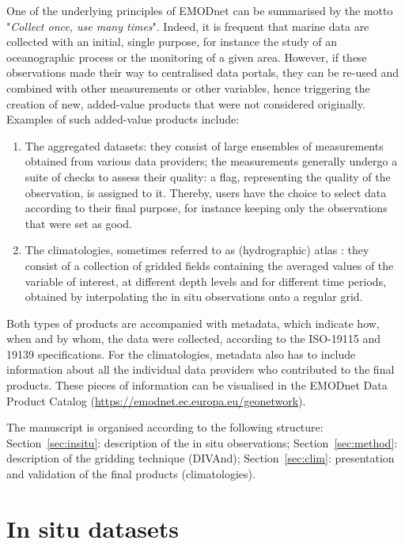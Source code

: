 \documentclass[essd,manuscript]{copernicus}
\begin{document}
One of the underlying principles of EMODnet can be summarised by the motto "\textit{Collect once, use many times}". Indeed, it is frequent that marine data are collected with an initial, single purpose, for instance the study of an oceanographic process or the monitoring of a given area. However, if these observations made their way to centralised data portals, they can be re-used and combined with other measurements or other variables, hence triggering the creation of new, added-value products that were not considered originally. Examples of such added-value products include:
\begin{enumerate}
\item The aggregated datasets: they consist of large ensembles of measurements obtained from various data providers; the measurements generally undergo a suite of checks to assess their quality: a flag, representing the quality of the observation, is assigned to it. Thereby, users have the choice to select data according to their final purpose, for instance keeping only the observations that were set as good.
\item The climatologies, sometimes referred to as (hydrographic) atlas \citep[e.g.][]{soton16209,Iona_2018}: they consist of a collection of gridded fields containing the averaged values of the variable of interest, at different depth levels and for different time periods, obtained by interpolating the in situ observations onto a regular grid.
\end{enumerate}

Both types of products are accompanied with metadata, which indicate how, when and by whom, the data were collected, according to the ISO-19115 and 19139 specifications. For the climatologies, metadata also has to include information about all the individual data providers who contributed to the final products. These pieces of information can be visualised in the EMODnet Data Product Catalog (\url{https://emodnet.ec.europa.eu/geonetwork}).

The manuscript is organised according to the following structure: Section~\ref{sec:insitu}: description of the in situ observations; Section~\ref{sec:method}: description of the gridding technique (DIVAnd); Section~\ref{sec:clim}: presentation and validation of the final products (climatologies). 


\section{In situ datasets\label{sec:insitu}}
\end{document}
